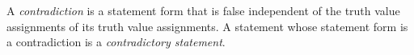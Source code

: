 \guard



\begin{defn}
\label{defn:contradiction}
  A \emph{contradiction} is a statement form that is false independent of the truth value assignments of its truth value assignments.
  A statement whose statement form is a contradiction is a \emph{contradictory statement}.
\end{defn}
